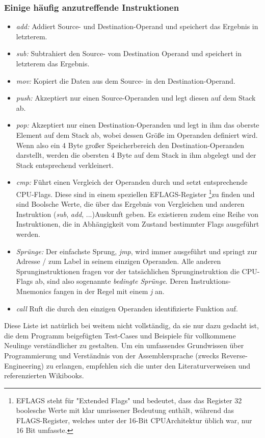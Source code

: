 \documentclass[11pt]{article}
\begin{document}
\subsubsection{Einige häufig anzutreffende Instruktionen}
\begin{itemize}
	\item{\textit{add:}} Addiert Source- und Destination-Operand und speichert das Ergebnis in
		letzterem.
	\item{\textit{sub:}} Subtrahiert den Source- vom Destination Operand und speichert in letzterem
		das Ergebnis.
	\item{\textit{mov:}} Kopiert die Daten aus dem Source- in den Destination-Operand.
	\item{\textit{push:}} Akzeptiert nur einen Source-Operanden und legt diesen auf dem Stack ab.
	\item{\textit{pop:}} Akzeptiert nur einen Destination-Operanden und legt in ihm das oberste
		Element auf dem Stack ab, wobei dessen Größe im Operanden definiert wird.
		Wenn also ein 4 Byte großer Speicherbereich den Destination-Operanden darstellt,
		werden die obersten 4 Byte auf dem Stack in ihm abgelegt und der Stack
		entsprechend verkleinert.
	\item{\textit{cmp:}} Führt einen Vergleich der Operanden durch und setzt entsprechende
		CPU-Flags. Diese sind in einem speziellen EFLAGS-Register
		\footnote{
			EFLAGS steht für "Extended Flags" und bedeutet, dass das Register 32 boolesche
			Werte mit klar umrissener Bedeutung enthält, während das FLAGS-Register, welches
			unter der 16-Bit CPUArchitektur üblich war, nur 16 Bit umfasste.
		}zu finden und sind
		Boolsche Werte, die über das Ergebnis von Vergleichen und anderen Instruktion (\textit{sub},
		\textit{add}, ...)Auskunft geben. Es existieren zudem eine Reihe von Instruktionen,
		die in Abhängigkeit vom Zustand bestimmter Flags ausgeführt werden.
	\item{\textit{Sprünge:}} Der einfachste Sprung, \textit{jmp}, wird immer ausgeführt und
		springt zur Adresse / zum Label in seinem einzigen Operanden. Alle anderen
		Sprunginstruktionen fragen vor der tatsächlichen Sprunginstruktion die CPU-Flags ab,
		sind also sogenannte \textit{bedingte Sprünge}. Deren Instruktions-Mnemonics fangen
		in der Regel mit einem \textit{j} an.
	\item{\textit{call}} Ruft die durch den einzigen Operanden identifizierte Funktion auf.
\end{itemize}
Diese Liste ist natürlich bei weitem nicht vollständig, da sie nur dazu gedacht ist, die dem
Programm beigefügten Test-Cases und Beispiele für vollkommene Neulinge verständlicher zu gestalten.
Um ein umfassendes Grundwissen über Programmierung und Verständnis von der Assemblersprache (zwecks
Reverse-Engineering) zu erlangen, empfehlen sich die unter den Literaturverweisen \cite{wikibook1:7}
und \cite{wikibook2:8} referenzierten Wikibooks.
\end{document}
